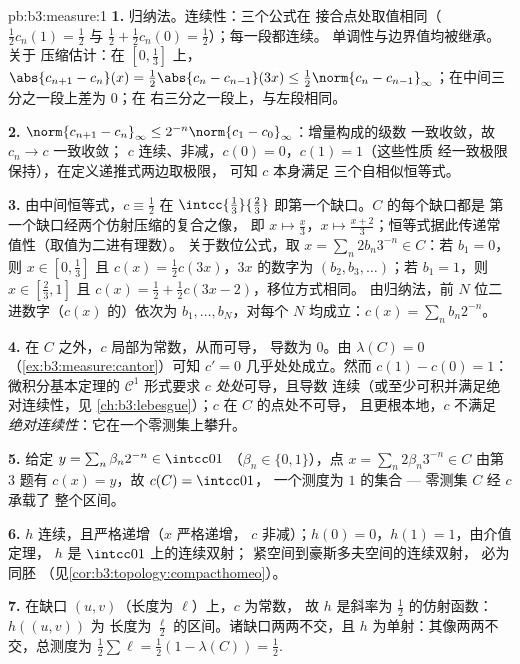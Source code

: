 \begin{solution}{pb:b3:measure:1}
\textbf{1.} 归纳法。连续性：三个公式在
接合点处取值相同（$\frac12c_n(1) = \frac12$ 与 $\frac12 +
\frac12c_n(0) = \frac12$）；每一段都连续。
单调性与边界值均被继承。关于
压缩估计：在 $[0,\frac13]$ 上，$\abs{c_{n+1} - c_n}(x)
= \frac12\abs{c_n - c_{n-1}}(3x) \leq \frac12\norm{c_n -
c_{n-1}}_\infty$；在中间三分之一段上差为 $0$；在
右三分之一段上，与左段相同。

\textbf{2.} $\norm{c_{n+1} - c_n}_\infty \leq
2^{-n}\norm{c_1 - c_0}_\infty$：增量构成的级数
一致收敛，故 $c_n \to c$ 一致收敛；
$c$ 连续、非减，$c(0) = 0$，$c(1) = 1$（这些性质
经一致极限保持），在定义递推式两边取极限，
可知 $c$ 本身满足
三个自相似恒等式。

\textbf{3.} 由中间恒等式，$c \equiv \frac12$ 在
$\intcc{\frac13}{\frac23}$ 即第一个缺口。$C$ 的每个缺口都是
第一个缺口经两个仿射压缩的复合之像，
即 $x \mapsto \frac x3$，$x\mapsto\frac{x +
2}3$；恒等式据此传递常值性（取值为二进有理数）。
关于数位公式，取 $x =
\sum_n 2b_n3^{-n} \in C$：若 $b_1 = 0$，则 $x \in
[0,\frac13]$ 且 $c(x) = \frac12c(3x)$，$3x$ 的数字为
$(b_2, b_3, \dots)$；若 $b_1 = 1$，则 $x \in [\frac23, 1]$
且 $c(x) = \frac12 + \frac12c(3x - 2)$，移位方式相同。
由归纳法，前 $N$ 位二进数字（$c(x)$ 的）依次为 $b_1,
\dots, b_N$，对每个 $N$ 均成立：$c(x) = \sum_nb_n2^{-n}$。

\textbf{4.} 在 $C$ 之外，$c$ 局部为常数，从而可导，
导数为 $0$。由 $\lambda(C) = 0$
（\cref{ex:b3:measure:cantor}）可知 $c' = 0$ 几乎处处成立。然而
$c(1) - c(0) = 1$：微积分基本定理的 $\mathcal
C^1$ 形式要求 $c$ \emph{处处}可导，且导数
连续（或至少可积并满足绝对连续性，见
\cref{ch:b3:lebesgue}）；$c$ 在 $C$ 的点处不可导，
且更根本地，$c$ 不满足
\emph{绝对连续性}：它在一个零测集上攀升。

\textbf{5.} 给定 $y = \sum_n\beta_n2^{-n} \in \intcc01$
（$\beta_n \in \{0,1\}$），点 $x = \sum_n2\beta_n3^{-n}
\in C$ 由第 3 题有 $c(x) = y$，故 $c(C) = \intcc01$，
一个测度为 $1$ 的集合 --- 零测集 $C$ 经 $c$ 承载了
整个区间。

\textbf{6.} $h$ 连续，且严格递增（$x$ 严格递增，
$c$ 非减）；$h(0) = 0$，$h(1) = 1$，由介值定理，
$h$ 是 $\intcc01$ 上的连续双射；
紧空间到豪斯多夫空间的连续双射，
必为同胚
（见\cref{cor:b3:topology:compacthomeo}）。

\textbf{7.} 在缺口 $(u, v)$（长度为 $\ell$）上，$c$ 为常数，
故 $h$ 是斜率为 $\frac12$ 的仿射函数：$h((u,v))$ 为
长度为 $\frac\ell2$ 的区间。诸缺口两两不交，且 $h$
为单射：其像两两不交，总测度为
$\frac12\sum\ell = \frac12(1 - \lambda(C)) = \frac12$.


\end{solution}
